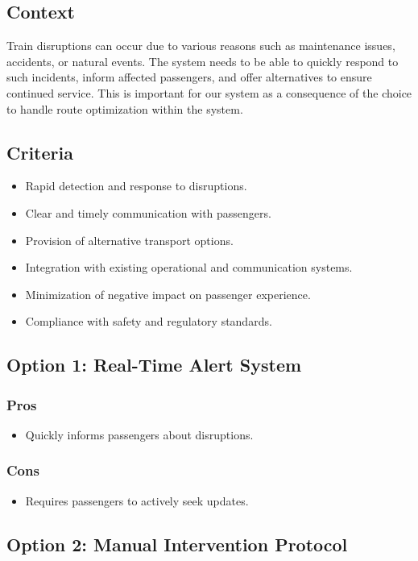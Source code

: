 \subsection*{Context}
Train disruptions can occur due to various reasons such as maintenance issues, accidents, or natural events. The system needs to be able to quickly respond to such incidents, inform affected passengers, and offer alternatives to ensure continued service.
This is important for our system as a consequence of the choice to handle route optimization within the system.

\subsection*{Criteria}
\begin{itemize}
    \item Rapid detection and response to disruptions.
    \item Clear and timely communication with passengers.
    \item Provision of alternative transport options.
    \item Integration with existing operational and communication systems.
    \item Minimization of negative impact on passenger experience.
    \item Compliance with safety and regulatory standards.
\end{itemize}


\subsection*{Option 1: Real-Time Alert System}
\subsubsection*{Pros}
\begin{itemize}
    \item Quickly informs passengers about disruptions.
\end{itemize}
\subsubsection*{Cons}
\begin{itemize}
    \item Requires passengers to actively seek updates.
\end{itemize}

\subsection*{Option 2: Manual Intervention Protocol}
